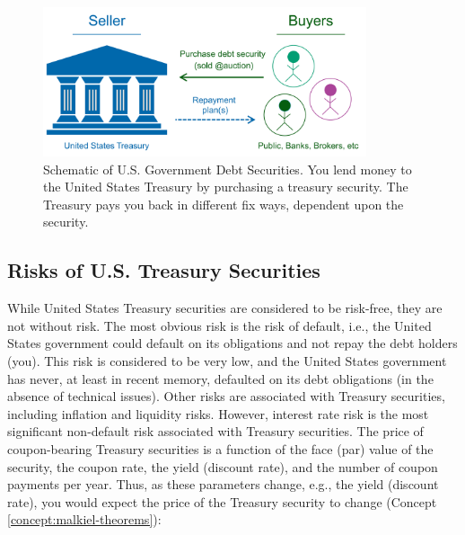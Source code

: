 \documentclass[11pt]{article}
\theoremstyle{definition}
\begin{document}
\begin{figure}[h]
    \centering
    \includegraphics[width=0.85\textwidth]{./figs/Fig-Govt-Debt-Schematic.pdf}
    \caption{Schematic of U.S. Government Debt Securities. You lend money to the United States Treasury by purchasing a treasury security.
	The Treasury pays you back in different fix ways, dependent upon the security.}\label{fig:govt-debt-schematic}
\end{figure}

\subsection{Risks of U.S. Treasury Securities}
While United States Treasury securities are considered to be risk-free, they are not without risk. The most obvious risk is the risk of default, i.e., the United States government could default on its obligations and not repay the debt holders (you).
This risk is considered to be very low, and the United States government has never, at least in recent memory, defaulted on its debt obligations (in the absence of technical issues). Other risks are associated with Treasury securities, including inflation and liquidity risks.
However, interest rate risk is the most significant non-default risk associated with Treasury securities.
The price of coupon-bearing Treasury securities is a function of the face (par) value of the security, the coupon rate, the yield (discount rate), and the number of coupon payments per year.
Thus, as these parameters change, e.g., the yield (discount rate), you would expect the price of the Treasury security to change (Concept \ref{concept:malkiel-theorems}):
\end{document}
